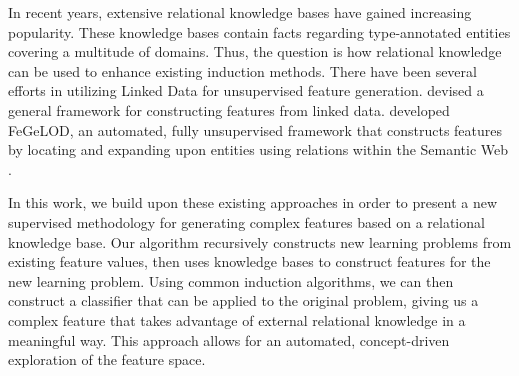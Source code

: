\documentclass{article}
\theoremstyle{definition}
\begin{document}
In recent years, extensive relational knowledge bases have gained increasing popularity. These knowledge bases contain facts regarding type-annotated entities covering a multitude of domains. %
 Thus, the question is how relational knowledge can be used to enhance existing induction methods.
There have been several efforts in utilizing Linked Data for unsupervised feature generation. \cite{cheng2011automatedfull} devised a general framework for constructing features from linked data. %
\cite{paulheim2012unsupervisedfull} developed FeGeLOD, an automated, fully unsupervised framework that constructs features by locating and expanding upon entities using relations within the Semantic Web \citep[see][]{bizer2009linkedfull}.%

In this work, we build upon these existing approaches in order to present a new supervised methodology for generating complex features based on a relational knowledge base. Our algorithm recursively constructs new learning problems from existing feature values, then uses knowledge bases to construct features for the new learning problem. %
Using common induction algorithms, we can then construct a classifier that can be applied to the original problem, giving us a complex feature that takes advantage of external relational knowledge in a meaningful way.
This approach allows for an automated, concept-driven exploration of the feature space.
\end{document}

